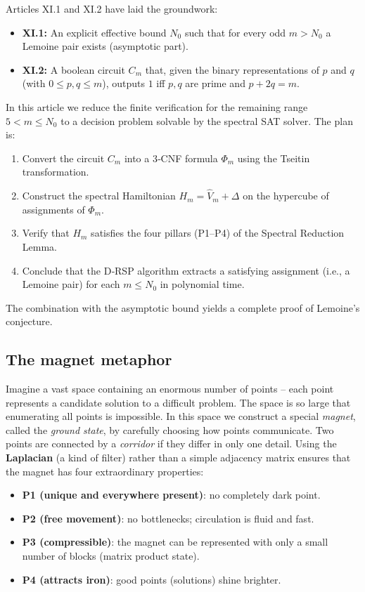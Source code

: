 \documentclass[11pt,a4paper]{article}
\begin{document}
Articles XI.1 and XI.2 have laid the groundwork:
\begin{itemize}
\item \textbf{XI.1:} An explicit effective bound \(N_0\) such that for every odd \(m>N_0\) a Lemoine pair exists (asymptotic part).
\item \textbf{XI.2:} A boolean circuit \(C_m\) that, given the binary representations of \(p\) and \(q\) (with \(0\le p,q\le m\)), outputs \(1\) iff \(p,q\) are prime and \(p+2q=m\).
\end{itemize}
In this article we reduce the finite verification for the remaining range \(5<m\le N_0\) to a decision problem solvable by the spectral SAT solver. The plan is:
\begin{enumerate}
\item Convert the circuit \(C_m\) into a 3‑CNF formula \(\Phi_m\) using the Tseitin transformation.
\item Construct the spectral Hamiltonian \(H_m = \hat{V}_m + \Delta\) on the hypercube of assignments of \(\Phi_m\).
\item Verify that \(H_m\) satisfies the four pillars (P1–P4) of the Spectral Reduction Lemma.
\item Conclude that the D‑RSP algorithm extracts a satisfying assignment (i.e., a Lemoine pair) for each \(m\le N_0\) in polynomial time.
\end{enumerate}
The combination with the asymptotic bound yields a complete proof of Lemoine's conjecture.

\subsection{The magnet metaphor}

Imagine a vast space containing an enormous number of points – each point represents a candidate solution to a difficult problem. The space is so large that enumerating all points is impossible. In this space we construct a special \emph{magnet}, called the \emph{ground state}, by carefully choosing how points communicate. Two points are connected by a \emph{corridor} if they differ in only one detail. Using the \textbf{Laplacian} (a kind of filter) rather than a simple adjacency matrix ensures that the magnet has four extraordinary properties:

\begin{itemize}
\item \textbf{P1 (unique and everywhere present)}: no completely dark point.
\item \textbf{P2 (free movement)}: no bottlenecks; circulation is fluid and fast.
\item \textbf{P3 (compressible)}: the magnet can be represented with only a small number of blocks (matrix product state).
\item \textbf{P4 (attracts iron)}: good points (solutions) shine brighter.
\end{itemize}
\end{document}

